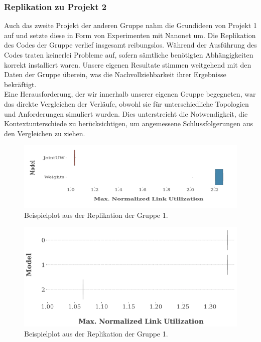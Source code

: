 \documentclass[sigconf, nonacm, review]{acmart}
\begin{document}
\subsubsection{Replikation zu Projekt 2}
{Auch das zweite Projekt \cite{replication-group1-pro2} der anderen Gruppe nahm die Grundideen von Projekt 1 auf und setzte diese in Form von Experimenten mit Nanonet um. Die Replikation des Codes der Gruppe verlief insgesamt reibungslos. Während der Ausführung des Codes traten keinerlei Probleme auf, sofern sämtliche benötigten Abhängigkeiten korrekt installiert waren. Unsere eigenen Resultate stimmen weitgehend mit den Daten der Gruppe überein, was die Nachvollziehbarkeit ihrer Ergebnisse bekräftigt.\\
Eine Herausforderung, der wir innerhalb unserer eigenen Gruppe begegneten, war das direkte Vergleichen der Verläufe, obwohl sie für unterschiedliche Topologien und Anforderungen simuliert wurden. Dies unterstreicht die Notwendigkeit, die Kontextunterschiede zu berücksichtigen, um angemessene Schlussfolgerungen aus den Vergleichen zu ziehen.}

\begin{figure}
\centering
\includegraphics[width=\linewidth]{figures/n1.png}
\caption{Beispielplot aus der Replikation der Gruppe 1.}
\label{fi2}
\end{figure}

\begin{figure}
\centering
\includegraphics[width=\linewidth]{figures/p1.png}
\caption{Beispielplot aus der Replikation der Gruppe 1.}
\label{fi3}
\end{figure}
\end{document}
